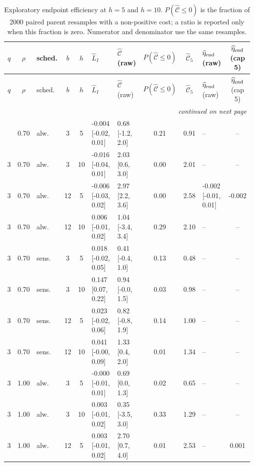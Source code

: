 \documentclass[10pt]{article}
\begin{document}
\begin{scriptsize}
\setlength{\tabcolsep}{3pt}
\begin{longtable}{cclcc l l c c l c}
\caption{Exploratory endpoint efficiency at $h=5$ and $h=10$. $P(\widehat{\mathcal C}\le0)$ is the fraction of 2000 paired parent resamples with a non-positive cost; a ratio is reported only when this fraction is zero. Numerator and denominator use the same resamples.}\label{tab:efficiency}\\
\toprule
$q$ & $\rho$ & sched. & $b$ & $h$ & $\widehat L_I$ & $\widehat{\mathcal C}$ (raw) & $P(\widehat{\mathcal C}\le0)$ & $\widehat{\mathcal C}_5$ & $\widehat\eta_{\rm end}$ (raw) & $\widehat\eta_{\rm end}$ (cap 5) \\
\midrule
\endfirsthead
\toprule
$q$ & $\rho$ & sched. & $b$ & $h$ & $\widehat L_I$ & $\widehat{\mathcal C}$ (raw) & $P(\widehat{\mathcal C}\le0)$ & $\widehat{\mathcal C}_5$ & $\widehat\eta_{\rm end}$ (raw) & $\widehat\eta_{\rm end}$ (cap 5) \\
\midrule
\endhead
\midrule
\multicolumn{11}{r}{\emph{continued on next page}}\\
\endfoot
\bottomrule
\endlastfoot
3 & 0.70 & alw. & 3 & 5 & -0.004 [-0.02, 0.01] & 0.68 [-1.2, 2.0] & 0.21 & 0.91 & -- & -- \\
3 & 0.70 & alw. & 3 & 10 & -0.016 [-0.04, 0.01] & 2.03 [0.6, 3.0] & 0.00 & 2.01 & -- & -- \\
3 & 0.70 & alw. & 12 & 5 & -0.006 [-0.03, 0.02] & 2.97 [2.2, 3.6] & 0.00 & 2.58 & -0.002 [-0.01, 0.01] & -0.002 \\
3 & 0.70 & alw. & 12 & 10 & 0.006 [-0.01, 0.02] & 1.04 [-3.4, 3.4] & 0.29 & 2.10 & -- & -- \\
3 & 0.70 & sens. & 3 & 5 & 0.018 [-0.02, 0.05] & 0.41 [-0.4, 1.0] & 0.13 & 0.48 & -- & -- \\
3 & 0.70 & sens. & 3 & 10 & 0.147 [0.07, 0.22] & 0.94 [-0.0, 1.5] & 0.03 & 0.98 & -- & -- \\
3 & 0.70 & sens. & 12 & 5 & 0.023 [-0.02, 0.06] & 0.82 [-0.8, 1.9] & 0.14 & 1.00 & -- & -- \\
3 & 0.70 & sens. & 12 & 10 & 0.041 [-0.00, 0.09] & 1.33 [0.4, 2.0] & 0.01 & 1.34 & -- & -- \\
3 & 1.00 & alw. & 3 & 5 & -0.000 [-0.01, 0.01] & 0.69 [0.0, 1.3] & 0.02 & 0.65 & -- & -- \\
3 & 1.00 & alw. & 3 & 10 & 0.003 [-0.01, 0.02] & 0.35 [-3.5, 3.0] & 0.33 & 1.29 & -- & -- \\
3 & 1.00 & alw. & 12 & 5 & 0.003 [-0.01, 0.02] & 2.70 [0.7, 4.0] & 0.01 & 2.53 & -- & 0.001 \\

\end{longtable}
\end{scriptsize}
\end{document}
